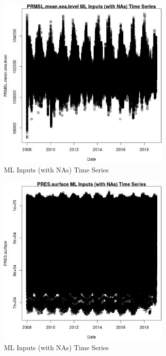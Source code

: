 \begin{figure} 
\centering  
\includegraphics[width=0.77\textwidth]{Code_Outputs/Report_ML_input_PM25_Step4_part_f_de_duplicated_aveswNAs_PRMSLmeansealevelvDate.jpg} 
\caption{\label{fig:Report_ML_input_PM25_Step4_part_f_de_duplicated_aveswNAsPRMSLmeansealevelvDate}ML Inputs (with NAs) Time Series} 
\end{figure} 
 

\begin{figure} 
\centering  
\includegraphics[width=0.77\textwidth]{Code_Outputs/Report_ML_input_PM25_Step4_part_f_de_duplicated_aveswNAs_PRESsurfacevDate.jpg} 
\caption{\label{fig:Report_ML_input_PM25_Step4_part_f_de_duplicated_aveswNAsPRESsurfacevDate}ML Inputs (with NAs) Time Series} 
\end{figure} 
 

